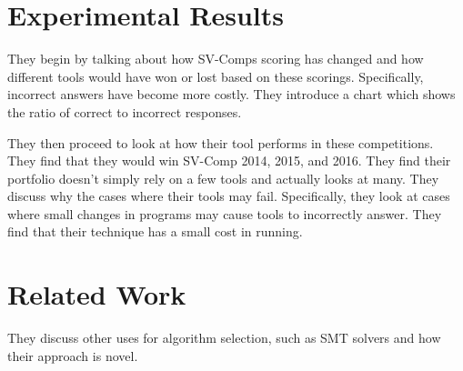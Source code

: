 \documentclass[a4paper]{article}
\begin{document}
\section{Experimental Results}
They begin by talking about how SV-Comps scoring has changed and how different tools would have won or lost based 
on these scorings. Specifically, incorrect answers have become more costly. They introduce a chart which shows 
the ratio of correct to incorrect responses.

They then proceed to look at how their tool performs in these competitions. They find that they would win SV-Comp 
2014, 2015, and 2016. They find their portfolio doesn't simply rely on a few tools and actually looks at many. 
They discuss why the cases where their tools may fail. Specifically, they look at cases where small changes in 
programs may cause tools to incorrectly answer. They find that their technique has a small cost in running.

\section{Related Work}
They discuss other uses for algorithm selection, such as SMT solvers and  how their approach is novel.
\end{document}
